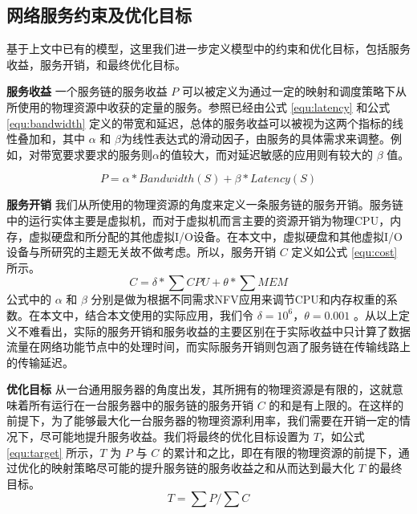 \subsection{网络服务约束及优化目标}
基于上文中已有的模型，这里我们进一步定义模型中的约束和优化目标，包括服务收益，服务开销，和最终优化目标。


\textbf{服务收益}{ }一个服务链的服务收益 $P$ 可以被定义为通过一定的映射和调度策略下从所使用的物理资源中收获的定量的服务。参照已经由公式 \ref{equ:latency} 和公式\ref{equ:bandwidth} 定义的带宽和延迟，总体的服务收益可以被视为这两个指标的线性叠加和，其中 $\alpha$ 和 $\beta$为线性表达式的滑动因子，由服务的具体需求来调整。例如，对带宽要求要求的服务则$\alpha$的值较大，而对延迟敏感的应用则有较大的 $\beta$ 值。

\begin{equation}
\label{equ:profit}
P = \alpha*Bandwidth(S) + \beta* Latency(S)
\end{equation}

\textbf{服务开销}{ }我们从所使用的物理资源的角度来定义一条服务链的服务开销。服务链中的运行实体主要是虚拟机，而对于虚拟机而言主要的资源开销为物理CPU，内存，虚拟硬盘和所分配的其他虚拟I/O设备。在本文中，虚拟硬盘和其他虚拟I/O设备与所研究的主题无关故不做考虑。所以，服务开销 $C$ 定义如公式 \ref{equ:cost} 所示。
\begin{equation}
\label{equ:cost}
C = \delta * \sum{CPU} + \theta *\sum{MEM} 
\end{equation}
公式中的 $\alpha$ 和 $\beta$ 分别是做为根据不同需求NFV应用来调节CPU和内存权重的系数。在本文中，结合本文使用的实际应用，我们令 $\delta = 10^{6}$，$\theta = 0.001$ 。从以上定义不难看出，实际的服务开销和服务收益的主要区别在于实际收益中只计算了数据流量在网络功能节点中的处理时间，而实际服务开销则包涵了服务链在传输线路上的传输延迟。

\textbf{优化目标}{ }从一台通用服务器的角度出发，其所拥有的物理资源是有限的，这就意味着所有运行在一台服务器中的服务链的服务开销 $C$ 的和是有上限的。在这样的前提下，为了能够最大化一台服务器的物理资源利用率，我们需要在开销一定的情况下，尽可能地提升服务收益。我们将最终的优化目标设置为 $T$，如公式 \ref{equ:target} 所示，$T$ 为 $P$ 与 $C$ 的累计和之比，即在有限的物理资源的前提下，通过优化的映射策略尽可能的提升服务链的服务收益之和从而达到最大化 $T$ 的最终目标。
\begin{equation}
\label{equ:target}
T = \sum P / \sum C  
\end{equation}

